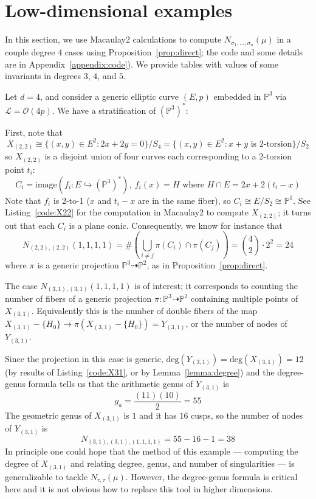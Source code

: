 \documentclass[thesis]{thesis-umich}           %
\renewcommand{\P}{\mathbb P}
\theoremstyle{definition}
\begin{document}
\section{Low-dimensional examples}

In this section, we use
Macaulay2 calculations to
compute $N_{\sigma_1,\dots,\sigma_n}(\mu)$ in a couple degree $4$ cases
using Proposition~\ref{prop:direct}; the
code and some details are in Appendix~\ref{appendix:code}). We provide tables with values of some invariants in degrees $3$, $4$, and $5$.

Let $d=4$, and consider a generic elliptic curve $(E,p)$ embedded in $\P^3$ via
$\mathcal L=\mathcal O(4p)$. We have a stratification of $(\P^3)^*$:


First, note that \[X_{(2,2)}\cong\{(x,y)\in E^2:2x+2y=0\}/S_4=\{(x,y)\in E^2:x+y\text{ is 2-torsion}\}/S_2\]
so $X_{(2,2)}$ is a disjoint union of four curves each corresponding to a 2-torsion point $t_i$:
\[
C_i=\text{image}(f_i:E\hookrightarrow(\P^3)^*),\ f_i(x)=H\text{ where }H\cap E=2x+2(t_i-x)
\]
Note that $f_i$ is 2-to-1 ($x$ and $t_i-x$ are in the same fiber), so $C_i\cong E/S_2\cong\P^1$. See Listing~\ref{code:X22} for the computation in Macaulay2 to compute $X_{(2,2)}$; it turns out that each $C_i$ is a plane conic. Consequently,
we know for instance that
\[
N_{(2,2),(2,2)}(1,1,1,1)=\#\left(\bigcup_{i\neq j}\pi(C_i)\cap \pi(C_j)\right)=\binom 42\cdot 2^2=24
\]
where $\pi$ is a generic projection $\P^3\dashrightarrow\P^2$, as in
Proposition~\ref{prop:direct}.

The case $N_{(3,1),(3,1)}(1,1,1,1)$ is of interest; it corresponds to counting
the number of fibers of a generic projection $\pi:\P^3\dashrightarrow\P^2$
containing multiple points of $X_{(3,1)}$. Equivalently this is the number of
double fibers of the map $X_{(3,1)}-\{H_0\}\to \pi(X_{(3,1)}-\{H_0\})=Y_{(3,1)}$, or the number of nodes of $Y_{(3,1)}$.

Since the projection in this case is generic, $\text{deg}(Y_{(3,1)})=\text{deg}(X_{(3,1)})=12$ (by results of Listing~\ref{code:X31}, or by Lemma~\ref{lemma:degree}) and the degree-genus formula tells us that the arithmetic genus
of $Y_{(3,1)}$ is
\[
g_a=\frac{(11)(10)}{2}=55
\]
The geometric genus of $X_{(3,1)}$ is $1$ and it has $16$ cusps,
so the number of nodes of $Y_{(3,1)}$ is%
\[
N_{(3,1),(3,1),(1,1,1,1)}=55-16-1=38
\]
In principle one could hope that the method of this example ---
computing the degree of $X_{(3,1)}$ and relating degree, genus, and
number of singularities
--- is generalizable to tackle $N_{\tau,\tau}(\mu)$. However, the degree-genus
formula is critical here and it is not obvious how to replace this tool in higher dimensions.
\end{document}
